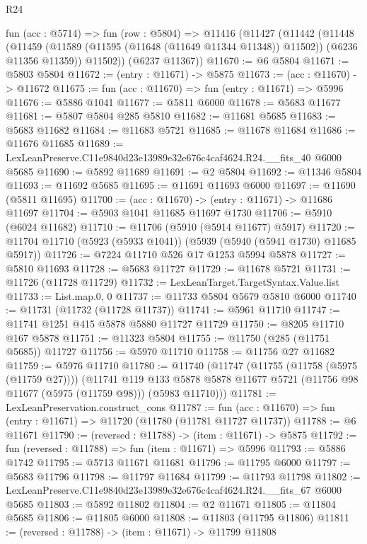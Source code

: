 \begin{lexlean}{R24}
\begin{coremodule}
  fun (acc : @5714) =>
  fun (row : @5804) =>
  @11416
    (@11427
      (@11442
        (@11448
          (@11459 (@11589 (@11595 (@11648 (@11649 @11344 @11348)) @11502)) (@6236 @11356 @11359))
          @11502))
      (@6237 @11367))
@11670 := @6 @5804
@11671 := @5803 @5804
@11672 := (entry : @11671) -> @5875
@11673 := (acc : @11670) -> @11672
@11675 := fun (acc : @11670) => fun (entry : @11671) => @5996
@11676 := @5886 @1041
@11677 := @5811 @6000
@11678 := @5683 @11677
@11681 := @5807 @5804 @285 @5810
@11682 := @11681 @5685
@11683 := @5683 @11682
@11684 := @11683 @5721
@11685 := @11678 @11684
@11686 := @11676 @11685
@11689 := LexLeanPreserve.C11e9840d23e13989e32e676c4caf4624.R24.__fits_40 @6000 @5685
@11690 := @5892 @11689
@11691 := @2 @5804
@11692 := @11346 @5804
@11693 := @11692 @5685
@11695 := @11691 @11693 @6000
@11697 := @11690 (@5811 @11695)
@11700 := (acc : @11670) -> (entry : @11671) -> @11686 @11697
@11704 := @5903 @1041 @11685 @11697 @1730
@11706 := @5910 (@6024 @11682)
@11710 := @11706 (@5910 (@5914 @11677) @5917)
@11720 := @11704 @11710 (@5923 (@5933 @1041)) (@5939 (@5940 (@5941 @1730) @11685 @5917))
@11726 := @7224 @11710 @526 @17 @1253 @5994 @5878
@11727 := @5810 @11693
@11728 := @5683 @11727
@11729 := @11678 @5721
@11731 := @11726 (@11728 @11729)
@11732 := LexLeanTarget.TargetSyntax.Value.list
@11733 := List.map.{0, 0}
@11737 := @11733 @5804 @5679 @5810 @6000
@11740 := @11731 (@11732 (@11728 @11737))
@11741 := @5961 @11710
@11747 := @11741 @1251 @415 @5878 @5880 @11727 @11729
@11750 := @8205 @11710 @167 @5878
@11751 := @11323 @5804
@11755 := @11750 (@285 (@11751 @5685)) @11727
@11756 := @5970 @11710
@11758 := @11756 @27 @11682
@11759 := @5976 @11710
@11780 := @11740
    (@11747
      (@11755 (@11758 (@5975 (@11759 @27))))
      (@11741
        @119
        @133
        @5878
        @5878
        @11677
        @5721
        (@11756 @98 @11677 (@5975 (@11759 @98)))
        (@5983 @11710)))
@11781 := LexLeanPreservation.construct_cons
@11787 := fun (acc : @11670) => fun (entry : @11671) => @11720 (@11780 (@11781 @11727 @11737))
@11788 := @6 @11671
@11790 := (reversed : @11788) -> (item : @11671) -> @5875
@11792 := fun (reversed : @11788) => fun (item : @11671) => @5996
@11793 := @5886 @1742
@11795 := @5713 @11671 @11681
@11796 := @11795 @6000
@11797 := @5683 @11796
@11798 := @11797 @11684
@11799 := @11793 @11798
@11802 := LexLeanPreserve.C11e9840d23e13989e32e676c4caf4624.R24.__fits_67 @6000 @5685
@11803 := @5892 @11802
@11804 := @2 @11671
@11805 := @11804 @5685
@11806 := @11805 @6000
@11808 := @11803 (@11795 @11806)
@11811 := (reversed : @11788) -> (item : @11671) -> @11799 @11808

\end{coremodule}
\end{lexlean}
